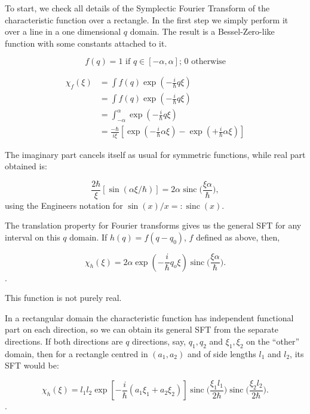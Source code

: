 \documentclass[a4paper,12pt]{article}
\newcommand{\ihb}{\frac{i}{\hbar}}
\DeclareMathOperator*{\sinc}{sinc}
\begin{document}
To start, we check all details of the Symplectic Fourier Transform
of the characteristic function over a rectangle. In the first step
we simply perform it over a line in a one dimensional $q$ domain.
The result is a Bessel-Zero-like  function with some constants attached
to it. 

\begin{equation}
f(q)=1 \text { if } q\in [-\alpha, \alpha]\text{; }0 \text{ otherwise}
\end{equation}

\begin{align}
\chi_f(\xi) &= \int f(q) \exp (-\ihb q \xi ) \\
&= \int f(q) \exp (-\ihb q \xi ) \\ 
&= \int_{-\alpha}^{\alpha} \exp (-\ihb q \xi ) \\ 
&= \frac{-\hbar}{i\xi}
[\exp(-\ihb \alpha\xi )- \exp(+\ihb\alpha\xi)]  
\end{align}

The imaginary part cancels itself as usual for symmetric functions,
while real part obtained is:

\begin{equation}
\frac{2 \hbar}{\xi}[\sin(\alpha \xi/\hbar)]=
 2\alpha \sinc \Big( \frac{\xi\alpha}{\hbar} \Big),
\end{equation}
using the Engineers notation for $\sin(x)/x=: \sinc (x)$.

The translation property for Fourier transforms gives us 
the general SFT for any interval on this $q$ domain.
If $h(q)=f(q-q_0)$, $f$ defined as above, then,

\begin{equation}
\chi_h (\xi)=2 \alpha \exp (-\ihb q_o \xi)
\sinc\Big( \frac{\xi\alpha}{\hbar} \Big).
\end{equation}.

This function is not purely real.

In a rectangular domain the characteristic function has independent
functional part on each direction, so we can obtain its general
SFT from the separate directions. If both directions are $q$ directions,
say, $q_1, q_2$ and $\xi_1, \xi_2$ on the ``other''  domain,  then
for a rectangle centred in $(a_1, a_2)$ and of side lengths
$l_1$ and $l_2$, its SFT would be:


\begin{equation}\label{qrect}
\chi_h (\xi)=l_1 l_2 
\exp [-\ihb (a_1 \xi_1 + a_2 \xi_2)]
\sinc \Big( \frac{\xi_1 l_1}{2 \hbar} \Big)
\sinc \Big( \frac{\xi_2 l_2  }{ 2 \hbar} \Big).
\end{equation}.
\end{document}
